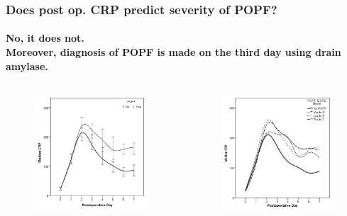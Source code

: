 \documentclass[10pt]{beamer}
\begin{document}
\begin{frame}
	\frametitle{Does post op. CRP predict severity of POPF?}
	\framesubtitle{No, it does not. \\ Moreover, diagnosis of POPF is made on the third day using drain amylase. }
	
	\begin{columns}
			\begin{figure}
				\includegraphics[width=\textwidth]{../Figures/crp_comp_crp_popf_yes_no}
			\end{figure}
	
			\begin{figure}
				\includegraphics[width=\textwidth]{../Figures/crp_comp_crp_popf_isgps}
			\end{figure}
	\end{columns}


\end{frame}
\end{document}
